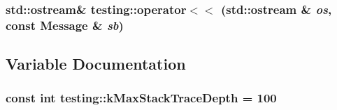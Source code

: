 \subsubsection{\setlength{\rightskip}{0pt plus 5cm}std::ostream\& testing::operator$<$$<$ (std::ostream \& {\em os}, const Message \& {\em sb})\hspace{0.3cm}{\tt  [inline]}}\label{namespacetesting_65c959bf8be30a10b2a122c50f36305b}




\subsection{Variable Documentation}
\subsubsection{\setlength{\rightskip}{0pt plus 5cm}const int {\bf testing::kMaxStackTraceDepth} = 100}\label{namespacetesting_9cac1f5e8a177c033ab6b61c230dc0b8}


